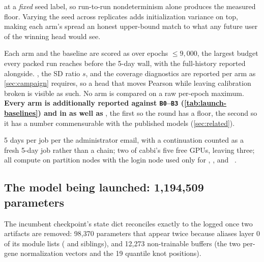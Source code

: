 \begin{description}
  at a \emph{fixed} seed label, so run-to-run nondeterminism alone produces the measured
  floor. Varying the seed across replicates adds initialization variance on top, making
  each arm's spread an honest upper-bound match to what any future user of the winning
  head would see.
\item[The scoring rule, declared before launch] Each arm and the baseline are scored as
   over epochs $\le 9{,}000$, the largest budget every packed run reaches
  before the 5-day wall, with the full-history  reported alongside.
  , the SD ratio $s$, and the coverage diagnostics are reported per arm as
  \cref{sec:campaign} requires, so a head that moves Pearson while leaving calibration
  broken is visible as such. No arm is compared on a raw per-epoch maximum.
  \textbf{Every arm is additionally reported against \texttt{B0}--\texttt{B3}
  (\cref{tab:launch-baselines}) and in  as well as
  }, the first so the round has a floor, the second so it has a
  number commensurable with the published models (\cref{sec:related}).
\item[Operational constraints honored] 5 days per job per the administrator email, with a
  continuation counted as a fresh 5-day job rather than a chain; two of cabbi's five free
  GPUs, leaving three; all compute on partition nodes with the login node used only for
  , , and ~.
\end{description}

\subsection{The model being launched: 1,194,509 parameters}

The incumbent checkpoint's state dict reconciles exactly to the logged
 once two artifacts are removed: 98,370 parameters that appear
twice because  aliases layer 0 of its module lists
( and siblings), and 12,273 non-trainable
buffers (the two per-gene normalization vectors and the 19 quantile knot positions).

